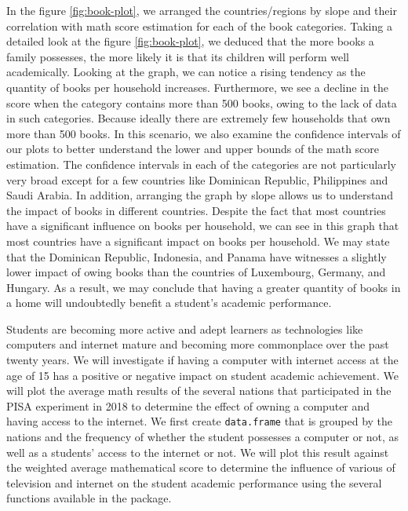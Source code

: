 In the figure \ref{fig:book-plot}, we arranged the countries/regions by
slope and their correlation with math score estimation for each of the
book categories. Taking a detailed look at the figure
\ref{fig:book-plot}, we deduced that the more books a family possesses,
the more likely it is that its children will perform well academically.
Looking at the graph, we can notice a rising tendency as the quantity of
books per household increases. Furthermore, we see a decline in the
score when the category contains more than 500 books, owing to the lack
of data in such categories. Because ideally there are extremely few
households that own more than 500 books. In this scenario, we also
examine the confidence intervals of our plots to better understand the
lower and upper bounds of the math score estimation. The confidence
intervals in each of the categories are not particularly very broad
except for a few countries like Dominican Republic, Philippines and
Saudi Arabia. In addition, arranging the graph by slope allows us to
understand the impact of books in different countries. Despite the fact
that most countries have a significant influence on books per household,
we can see in this graph that most countries have a significant impact
on books per household. We may state that the Dominican Republic,
Indonesia, and Panama have witnesses a slightly lower impact of owing
books than the countries of Luxembourg, Germany, and Hungary. As a
result, we may conclude that having a greater quantity of books in a
home will undoubtedly benefit a student's academic performance.

Students are becoming more active and adept learners as technologies
like computers and internet mature and becoming more commonplace over
the past twenty years. We will investigate if having a computer with
internet access at the age of 15 has a positive or negative impact on
student academic achievement. We will plot the average math results of
the several nations that participated in the PISA experiment in 2018 to
determine the effect of owning a computer and having access to the
internet. We first create \texttt{data.frame} that is grouped by the
nations and the frequency of whether the student possesses a computer or
not, as well as a students' access to the internet or not. We will plot
this result against the weighted average mathematical score to determine
the influence of various of television and internet on the student
academic performance using the several functions available in the
 \citep{ggplot2} package.

